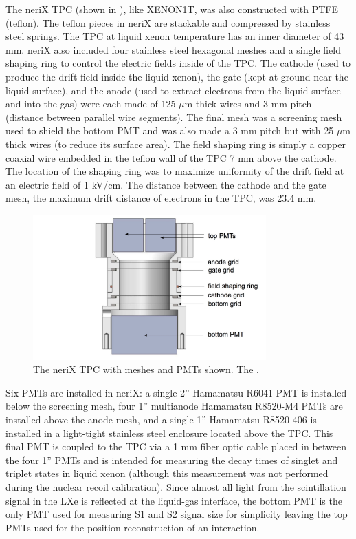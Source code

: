 The neriX TPC (shown in ), like XENON1T, was also constructed with PTFE (teflon).  The teflon pieces in neriX are stackable and compressed by stainless steel springs.  The TPC at liquid xenon temperature has an inner diameter of 43 mm.  neriX also included four stainless steel hexagonal meshes and a single field shaping ring to control the electric fields inside of the TPC.  The cathode (used to produce the drift field inside the liquid xenon), the gate (kept at ground near the liquid surface), and the anode (used to extract electrons from the liquid surface and into the gas) were each made of  125 $\mu$m thick wires and 3 mm pitch (distance between parallel wire segments).  The final mesh was a screening mesh used to shield the bottom PMT and was also made a 3 mm pitch but with 25 $\mu$m thick wires (to reduce its surface area).  The field shaping ring is simply a copper coaxial wire embedded in the teflon wall of the TPC 7 mm above the cathode.  The location of the shaping ring was to maximize uniformity of the drift field at an electric field of 1 kV/cm.  The distance between the cathode and the gate mesh, the maximum drift distance of electrons in the TPC, was 23.4 mm.



\begin{figure}[t]
        \centering
	\includegraphics[width=0.8\textwidth]{nerix_tpc_labeled}
	\caption{The neriX TPC with meshes and PMTs shown.  The .}
	\label{fig:nerix_tpc_labeled}
\end{figure}
   

Six PMTs are installed in neriX: a single 2'' Hamamatsu R6041 PMT is installed below the screening mesh, four 1'' multianode Hamamatsu R8520-M4 PMTs are installed above the anode mesh, and a single 1'' Hamamatsu R8520-406 is installed in a light-tight stainless steel enclosure located above the TPC.  This final PMT is coupled to the TPC via a 1 mm fiber optic cable placed in between the four 1'' PMTs and is intended for measuring the decay times of singlet and triplet states in liquid xenon (although this measurement was not performed during the nuclear recoil calibration).  Since almost all light from the scintillation signal in the LXe is reflected at the liquid-gas interface, the bottom PMT is the only PMT used for measuring S1 and S2 signal size for simplicity leaving the top PMTs used for the position reconstruction of an interaction.

